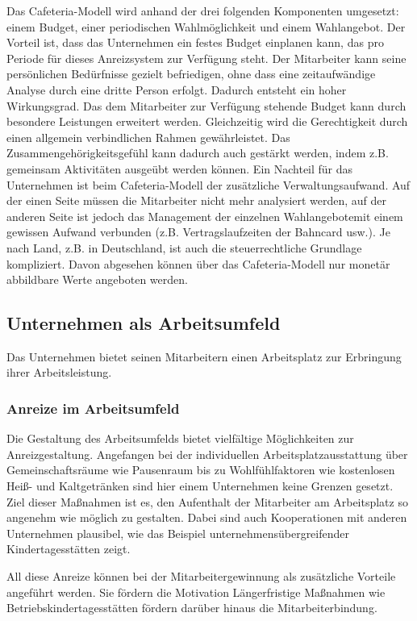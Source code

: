 Das Cafeteria-Modell wird anhand der drei folgenden Komponenten umgesetzt: einem Budget, einer periodischen Wahlmöglichkeit und einem Wahlangebot.
Der Vorteil ist, dass das Unternehmen ein festes Budget einplanen kann, das pro Periode für dieses Anreizsystem zur Verfügung steht. Der Mitarbeiter kann seine persönlichen Bedürfnisse gezielt befriedigen, ohne dass eine zeitaufwändige Analyse durch eine dritte Person erfolgt. Dadurch entsteht ein hoher Wirkungsgrad. Das dem Mitarbeiter zur Verfügung stehende Budget kann durch besondere Leistungen erweitert werden.
Gleichzeitig wird die Gerechtigkeit durch einen allgemein verbindlichen Rahmen gewährleistet. Das Zusammengehörigkeitsgefühl kann dadurch auch gestärkt werden, indem z.B. gemeinsam Aktivitäten ausgeübt werden können. Ein Nachteil für das Unternehmen ist beim Cafeteria-Modell der zusätzliche Verwaltungsaufwand. Auf der einen Seite müssen die Mitarbeiter nicht mehr analysiert werden, auf der anderen Seite ist jedoch das Management der einzelnen \glqq Wahlangebote\grqq mit einem gewissen Aufwand verbunden (z.B. Vertragslaufzeiten der Bahncard usw.).
Je nach Land, z.B. in Deutschland, ist auch die steuerrechtliche Grundlage kompliziert. 
Davon abgesehen können über das Cafeteria-Modell nur monetär abbildbare Werte angeboten werden. \cite[S. 55ff]{Nowka.2013}

\subsection{Unternehmen als Arbeitsumfeld}
Das Unternehmen bietet seinen Mitarbeitern einen Arbeitsplatz zur Erbringung ihrer Arbeitsleistung. 

\subsubsection{Anreize im Arbeitsumfeld}
Die Gestaltung des Arbeitsumfelds bietet vielfältige Möglichkeiten zur Anreizgestaltung. Angefangen bei der individuellen Arbeitsplatzausstattung über Gemeinschaftsräume wie Pausenraum bis zu Wohlfühlfaktoren wie kostenlosen Heiß- und Kaltgetränken sind hier einem Unternehmen keine Grenzen gesetzt. Ziel dieser Maßnahmen ist es, den Aufenthalt der Mitarbeiter am Arbeitsplatz so angenehm wie möglich zu gestalten. Dabei sind auch Kooperationen mit anderen Unternehmen plausibel, wie das Beispiel unternehmensübergreifender Kindertagesstätten zeigt. 

All diese Anreize können bei der Mitarbeitergewinnung als zusätzliche Vorteile angeführt werden. Sie fördern die Motivation  Längerfristige Maßnahmen wie Betriebskindertagesstätten fördern darüber hinaus die Mitarbeiterbindung. 

